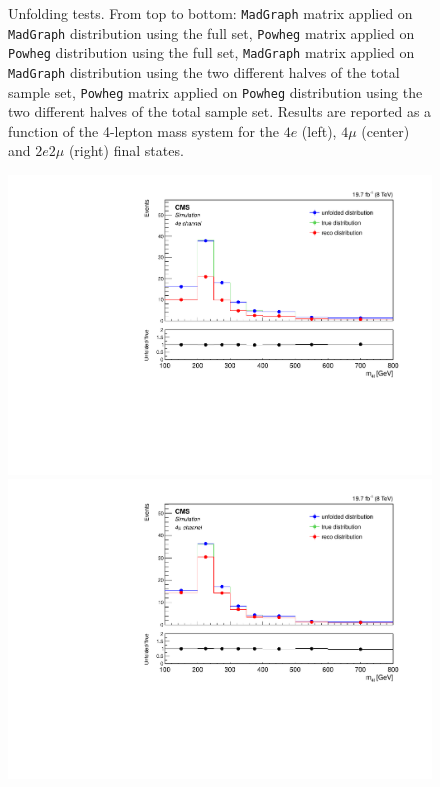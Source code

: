 \begin{figure}[hbtp]
\begin{center}
      \caption{Unfolding tests. From top to bottom: \texttt{MadGraph} matrix applied on \texttt{MadGraph} distribution using the full set, \texttt{Powheg} matrix applied on \texttt{Powheg} distribution using the full set,  \texttt{MadGraph} matrix applied on \texttt{MadGraph} distribution using the two different halves of the total sample set, \texttt{Powheg} matrix applied on \texttt{Powheg} distribution using the two different halves of the total sample set. Results are reported as a function of the 4-lepton mass system for the $4e$ (left), $4\mu$ (center) and $2e2\mu$ (right) final states.}
    \label{fig:MCtest_Mass1}
  \end{center}
\end{figure}

\begin{figure}[hbtp]
  \begin{center}
    \includegraphics[width=0.8\cmsFigWidth]{Figures/Unfolding/MCTests/Mass_ZZTo4e_MadMatrix_PowDistr_FullSample_fr}     
    \includegraphics[width=0.8\cmsFigWidth]{Figures/Unfolding/MCTests/Mass_ZZTo4m_MadMatrix_PowDistr_FullSample_fr}     

\end{center}
\end{figure}
